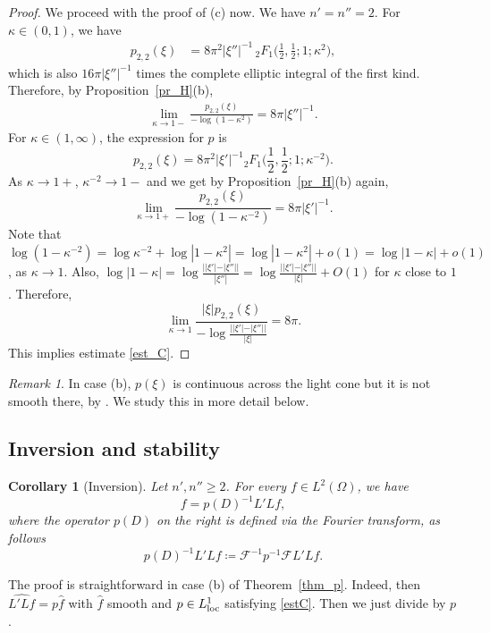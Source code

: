 \documentclass[11pt]{amsart}
\newtheorem{corollary}[theorem]{Corollary}
\theoremstyle{definition}
\theoremstyle{remark}
\newtheorem{remark}[theorem]{Remark}
\numberwithin{equation}{section}
\begin{document}
\begin{proof}
We proceed with the proof of (c) now. We have $n'=n''=2$. 
For $\kappa \in (0,1)$, we have 
\begin{align*}
	p_{2,2}(\xi) &= 8 \pi^2 |\xi''|^{-1} \,{}_2F_1\Big(\frac{1}{2}, \frac{1}{2}; 1; \kappa^2\Big),
\end{align*}
which is also $16\pi |\xi''|^{-1} $ times the complete elliptic integral of the first kind. 
Therefore, by Proposition~\ref{pr_H}(b), 
\begin{align*}
	\lim_{\kappa \to 1-} \frac{p_{2,2}(\xi)}{-\log(1-\kappa^2)} = 8 \pi |\xi''|^{-1}.
\end{align*}
For $\kappa \in (1,\infty)$, the expression for $p$ is
\[
p_{2,2}(\xi) = 8 \pi^2 |\xi'|^{-1} {}_2F_1\Big(\frac{1}{2}, \frac{1}{2}; 1; \kappa^{-2}\Big).
\]
As $\kappa \to 1+$, $\kappa^{-2} \to 1-$ and we get by Proposition~\ref{pr_H}(b) again,
\[
\lim_{\kappa \to 1+} \frac{p_{2,2}(\xi)}{-\log(1-\kappa^{-2})} = 8 \pi |\xi'|^{-1}.
\]
Note that $\log(1-\kappa^{-2})= \log\kappa^{-2} + \log|1-\kappa^2|= \log|1-\kappa^2|+o(1) = \log{|1-\kappa|} + o(1)$, as $\kappa\to1$. Also, $\log|1-\kappa| = \log\frac{||\xi'|-|\xi''| |}{|\xi''|} = \log\frac{||\xi'|-|\xi''| |}{|\xi|}+ O(1)$ for $\kappa$ close to $1$. Therefore,
\begin{equation}   \label{limp}
\lim_{\kappa \to 1} \frac{|\xi| p_{2,2}(\xi)}{-\log\frac{||\xi'|-|\xi''| |}{|\xi|}} = 8 \pi .
\end{equation}
This implies  estimate \eqref{est_C}.
\end{proof}

\begin{remark}
	In case (b), $p(\xi)$ is continuous across the light cone but it is not smooth there, by \cite[Theorem~7.1.18]{Hormander1}. We study this in more detail below. 
\end{remark}

\subsection{Inversion and stability} 

\begin{corollary}[Inversion]
	Let $n',n'' \geq 2$. For every $f\in L^2(\Omega)$, we have
	\[
	f = p(D)^{-1}L'Lf,
	\]
    where the operator $p(D)$ on the right is defined via the Fourier transform, as follows
    \[
p(D)^{-1} L'L f \coloneqq \mathcal{F}^{-1} p^{-1} \mathcal{F} L'L f .
    \]
\end{corollary}

The proof is straightforward in case (b) of Theorem~\ref{thm_p}. Indeed, then $\widehat{L'Lf}= p \hat f$ with $\hat f$ smooth and $p\in L^1_\textrm{\rm loc}$ satisfying \eqref{estC}. Then we just divide by $p$.  
\end{document}
